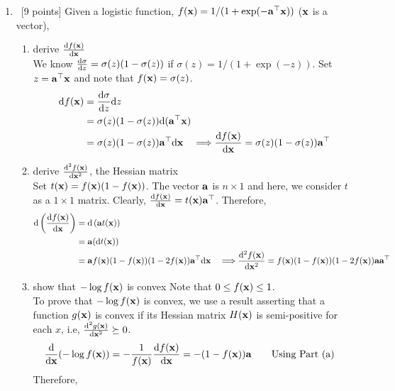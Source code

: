\documentclass[12pt, fullpage,letterpaper]{article}
\def\blackblue{\color{black!40!blue}}
\begin{document}
\begin{enumerate}
\item~[9 points] Given a logistic function, $f({\bf x}) = 1/(1+\exp(-{\bf a}^\top {\bf x}))$ (${\bf x}$ is a vector),  
\begin{enumerate}
\item derive $\frac{{\rm d} f({\bf x})}{{\rm d} {\bf x}}$\\
{\blackblue\noindent 
We know $\frac{{\rm d} \sigma}{{\rm d} z} = \sigma(z)(1-\sigma(z))$ if $\sigma(z) = 1/(1+\exp(-z))$. 
Set $z= {\bf a}^\top {\bf x}$ and note that $f({\bf x}) = \sigma(z)$.
\begin{align*}
{\rm d} f({\bf x})&= \frac{{\rm d} \sigma}{{\rm d} z}{\rm d} z\\
& = \sigma(z)(1-\sigma(z)){\rm d}({\bf a}^\top{\bf x})\\
& = \sigma(z)(1-\sigma(z)){\bf a}^\top{\rm d}{\bf x} \quad\Longrightarrow {{\rm d}f({\bf x})\over {\rm d}{\bf x}} = \sigma(z)(1-\sigma(z)){\bf a}^\top
\end{align*}}
\item derive $\frac{{\rm d}^2 f({\bf x})}{{\rm d} {\bf x}^2}$, \ie the Hessian matrix\\
{\blackblue\noindent 
Set $t({\bf x}) = f({\bf x})(1-f({\bf x}))$.
The vector ${\bf a}$ is $n\times 1$ and here, we consider $t$ as a $1\times 1$ matrix. 
Clearly, $\frac{{\rm d} f({\bf x})}{{\rm d} {\bf x}}  = t({\bf x}){\bf a}^\top$.
Therefore, 
\begin{align*}
{\rm d}\left(\frac{{\rm d} f({\bf x})}{{\rm d} {\bf x}}\right)
& = {\rm d} \left({\bf a} t({\bf x})\right)\\
& = {\bf a}({\rm d} t({\bf x}))\\
& = {\bf a} f({\bf x})(1-f({\bf x}))(1-2f({\bf x})){\bf a}^\top{\rm d}{\bf x} \quad\Longrightarrow \frac{{\rm d}^2 f({\bf x})}{{\rm d} {\bf x}^2}  =f({\bf x})(1-f({\bf x}))(1-2f({\bf x})) {\bf a} {\bf a}^\top
\end{align*}
}
\item show that $-\log f({\bf x})$ is convex 
Note that $0 \le f({\bf x}) \le 1$.\\
{\blackblue\noindent 
To prove that $-\log f({\bf x})$ is convex, we use a result  asserting that a function $g({\bf x})$ is convex if its Hessian matrix $H({\bf x})$ is semi-positive for each $x$, i.e, 
$\frac{{\rm d}^2 g({\bf x})}{{\rm d} {\bf x}^2} \succeq 0$. 
\begin{align*}
\frac{{\rm d} }{{\rm d} {\bf x}} (-\log f({\bf x})) 
& = -\frac{1}{f({\bf x})}\frac{{\rm d} f({\bf x})}{{\rm d} {\bf x}} = -(1-f({\bf x})){\bf a} \quad\quad\mbox{Using Part (a)}
\end{align*}
Therefore, 
\begin{align*}

\end{align*}}
\end{enumerate}
\end{enumerate}
\end{document}
